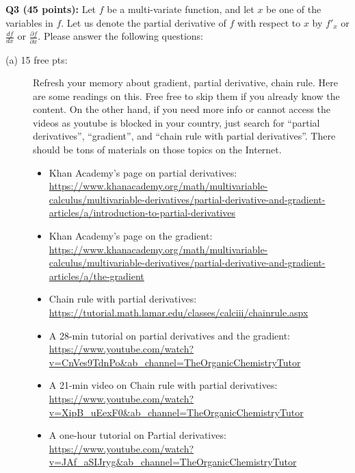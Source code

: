 \documentclass[11pt]{article}
\begin{document}
\vspace{0.4 in}
\noindent
    {\bf Q3 (45 points):} Let $f$ be a multi-variate function, and let $x$
    be one of the variables in $f$. Let us denote the partial derivative of
    $f$ with respect to $x$ by $f'_x$ or
    $\frac{df}{dx}$ or $\frac{\partial f}{\partial x}$.
    Please answer the following questions:

\begin{description}

\item [(a) 15 free pts:] Refresh your memory about gradient, partial derivative,
  chain rule. Here are some readings on this. Free free to skip them
  if you already know the content. On the other hand, if you need more
  info or cannot access the videos as youtube is blocked in your country,
  just search for ``partial derivatives'',
  ``gradient'', and ``chain rule with partial derivatives''.
  There should be tons of materials on those topics on the
  Internet. 
  \begin{itemize}
  \item Khan Academy's page on partial derivatives: \\
    \url{https://www.khanacademy.org/math/multivariable-calculus/multivariable-derivatives/partial-derivative-and-gradient-articles/a/introduction-to-partial-derivatives}
    
  \item Khan Academy's page on the gradient: \\
    \url{https://www.khanacademy.org/math/multivariable-calculus/multivariable-derivatives/partial-derivative-and-gradient-articles/a/the-gradient}

  \item Chain rule with partial derivatives: \\
    \url{https://tutorial.math.lamar.edu/classes/calciii/chainrule.aspx}
    
  \item A 28-min tutorial on partial derivatives and the gradient: \\
     \url{https://www.youtube.com/watch?v=CnVes9TdnPo&ab_channel=TheOrganicChemistryTutor}

  \item A 21-min video on Chain rule with partial derivatives: \\
     \url{https://www.youtube.com/watch?v=XipB_uEexF0&ab_channel=TheOrganicChemistryTutor}
     
  \item A one-hour tutorial on Partial derivatives: \\
    \url{https://www.youtube.com/watch?v=JAf_aSIJryg&ab_channel=TheOrganicChemistryTutor} \\ \\


\end{itemize}
\end{description}
\end{document}
